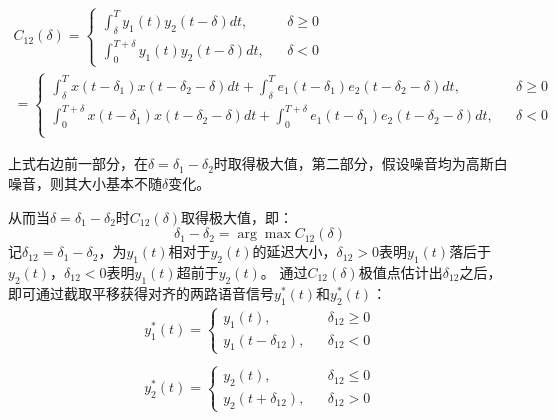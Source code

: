 \begin{equation}\label{eq:corr}
\begin{array}{c}
    C_{12}(\delta)  = \left\{
    \begin{array}{rcl}
        \int_\delta^Ty_1(t)y_2(t-\delta)dt, && {\delta \geq 0} \\
        \int_0^{T+\delta}y_1(t)y_2(t-\delta)dt, && {\delta < 0}
    \end{array}
    \right. \\
    = \left\{
    \begin{array}{rcl}
        \int_\delta^Tx(t-\delta_1)x(t-\delta_2-\delta)dt+\int_\delta^Te_1(t-\delta_1)e_2(t-\delta_2-\delta)dt, && {\delta \geq 0} \\
        \int_0^{T+\delta}x(t-\delta_1)x(t-\delta_2-\delta)dt+\int_0^{T+\delta}e_1(t-\delta_1)e_2(t-\delta_2-\delta)dt, && {\delta < 0} \\
    \end{array}
    \right.
\end{array}
\end{equation}

上式右边前一部分，在$\delta=\delta_1-\delta_2$时取得极大值，第二部分，假设噪音均为高斯白噪音，则其大小基本不随$\delta$变化。

从而当$\delta=\delta_1-\delta_2$时$C_{12}(\delta)$取得极大值，即：
\begin{equation}
\delta_1 - \delta_2 = \arg \max C_{12}(\delta)
\end{equation}
记$\delta_{12}=\delta_1-\delta_2$，为$y_1 (t)$相对于$y_2 (t)$的延迟大小，$\delta_{12}>0$表明$y_1(t)$落后于$y_2(t)$，$\delta_{12}<0$表明$y_1(t)$超前于$y_2(t)$。
通过$C_{12}(\delta)$极值点估计出$\delta_{12}$之后，即可通过截取平移获得对齐的两路语音信号$y_1^*(t)$和$y_2^*(t)$：
\begin{equation}
    \begin{array}{l}
        y_1^*(t)=  \left\{ 
            \begin{array}{rcl}
            y_1(t), && {\delta_{12} \geq 0} \\
            y_1(t-\delta_{12}), && {\delta_{12} < 0}
            \end{array}
        \right. \\
        \\
        y_2^*(t)= \left\{ 
            \begin{array}{rcl}
            y_2(t), && {\delta_{12} \leq 0} \\
            y_2(t+\delta_{12}), && {\delta_{12} > 0}
            \end{array}
        \right.
    \end{array}
\end{equation}

